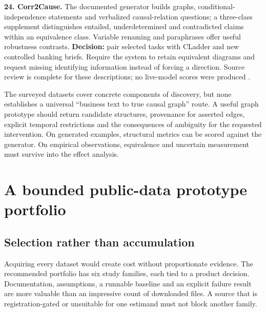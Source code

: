 \textbf{24. Corr2Cause.} The documented generator builds graphs,
conditional-independence statements and verbalized causal-relation
questions; a three-class supplement distinguishes entailed,
underdetermined and contradicted claims within an equivalence class.
Variable renaming and paraphrases offer useful robustness contrasts.
\textbf{Decision:} pair selected tasks with CLadder and new controlled
banking briefs. Require the system to retain equivalent diagrams and
request missing identifying information instead of forcing a direction.
Source review is complete for these descriptions; no live-model scores
were produced \citep{pd15_corr2cause_pinned}.

The surveyed datasets cover concrete components of discovery, but none
establishes a universal ``business text to true causal graph'' route. A
useful graph prototype should return candidate structures, provenance
for asserted edges, explicit temporal restrictions and the consequences
of ambiguity for the requested intervention. On generated examples,
structural metrics can be scored against the generator. On empirical
observations, equivalence and uncertain measurement must survive into
the effect analysis.

\hypertarget{pd15:portfolio}{%
\chapter{A bounded public-data prototype
portfolio}\label{pd15:portfolio}}

\hypertarget{selection-rather-than-accumulation}{%
\section{Selection rather than
accumulation}\label{selection-rather-than-accumulation}}

Acquiring every dataset would create cost without proportionate
evidence. The recommended portfolio has six study families, each tied to
a product decision. Documentation, assumptions, a runnable baseline and
an explicit failure result are more valuable than an impressive count of
downloaded files. A source that is registration-gated or unsuitable for
one estimand must not block another family.


